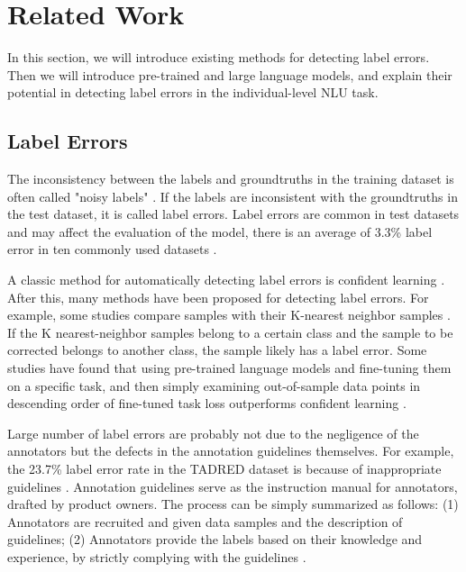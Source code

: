 \section{Related Work}
In this section, we will introduce existing methods for detecting label errors. Then we will introduce pre-trained and large language models, and explain their potential in detecting label errors in the individual-level NLU task.

\subsection{Label Errors}
The inconsistency between the labels and groundtruths in the training dataset is often called "noisy labels" \cite{song2022learning}. If the labels are inconsistent with the groundtruths in the test dataset, it is called label errors. Label errors are common in test datasets and may affect the evaluation of the model, there is an average of 3.3\% label error in ten commonly used datasets \cite{northcutt2021pervasive}. 

A classic method for automatically detecting label errors is confident learning \cite{northcutt2021confident}. After this, many methods have been proposed for detecting label errors. For example, some studies compare samples with their K-nearest neighbor samples \cite{zhu2022detecting,zhu2023unmasking}. If the K nearest-neighbor samples belong to a certain class and the sample to be corrected belongs to another class, the sample likely has a label error. Some studies have found that using pre-trained language models and fine-tuning them on a specific task, and then simply examining out-of-sample data points in descending order of fine-tuned task loss outperforms confident learning \cite{chong2022detecting}.

Large number of label errors are probably not due to the negligence of the annotators but the defects in the annotation guidelines themselves. For example, the 23.7\% label error rate in the TADRED dataset is because of inappropriate guidelines \cite{stoica2021re}. Annotation guidelines serve as the instruction manual for annotators, drafted by product owners. The process can be simply summarized as follows: (1) Annotators are recruited and given data samples and the description of guidelines; (2) Annotators provide the labels based on their knowledge and experience, by strictly complying with the guidelines \cite{klie2024analyzing}.


